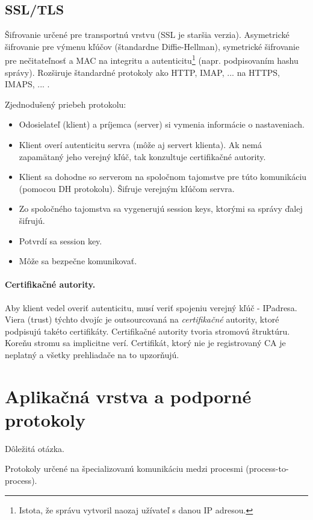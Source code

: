 \documentclass[10pt,a4paper]{article}
\begin{document}
\subsection{SSL/TLS}                 
Šifrovanie určené pre transportnú vrstvu (SSL je staršia verzia). 
Asymetrické šifrovanie pre výmenu kľúčov (štandardne Diffie-Hellman), 
symetrické šifrovanie pre nečitateľnosť a
MAC na integritu a autenticitu\footnote{
Istota, že správu vytvoril naozaj užívateľ s danou IP adresou. 
} (napr. podpisovaním hashu správy). 
Rozširuje štandardné protokoly ako HTTP, IMAP, ... na HTTPS, IMAPS, ... .

Zjednodušený priebeh protokolu:
\begin{itemize}
\item Odosielateľ (klient) a príjemca (server) si vymenia informácie o nastaveniach. 
\item Klient overí autenticitu servra (môže aj servert klienta). Ak nemá zapamätaný jeho verejný kľúč, tak konzultuje certifikačné autority. 
\item Klient sa dohodne so serverom na spoločnom tajomstve pre túto komunikáciu (pomocou DH protokolu). Šifruje verejným kľúčom servra. 
\item Zo spoločného tajomstva sa vygenerujú session keys, ktorými sa správy ďalej šifrujú. 
\item Potvrdí sa session key. 
\item Môže sa bezpečne komunikovať.
\end{itemize} 

\paragraph{Certifikačné autority.}
Aby klient vedel overiť autenticitu, musí veriť spojeniu verejný kľúč - IPadresa. 
Viera (trust) týchto dvojíc je outsourcovaná na \emph{certifikačné} autority,
ktoré podpisujú takéto certifikáty. Certifikačné autority tvoria stromovú štruktúru. Koreňu stromu sa implicitne verí. 
Certifikát, ktorý nie je registrovaný CA je neplatný a všetky prehliadače na to upzorňujú. 
            
\section{Aplikačná vrstva a podporné protokoly}     
Dôležitá otázka.   

Protokoly určené na špecializovanú komunikáciu medzi procesmi (process-to-process).  
\end{document}
